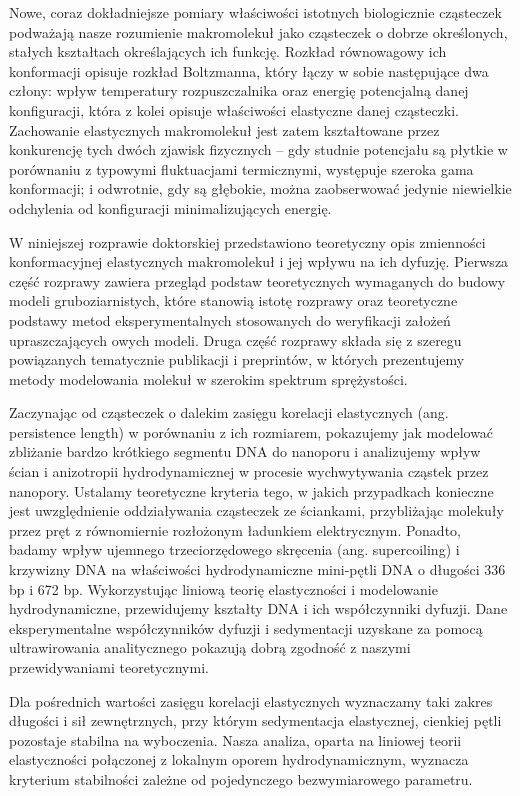 Nowe, coraz dokładniejsze pomiary właściwości istotnych biologicznie cząsteczek podważają nasze rozumienie makromolekuł jako cząsteczek o dobrze określonych, stałych kształtach określających ich funkcję.
Rozkład równowagowy ich konformacji opisuje rozkład Boltzmanna, który łączy w sobie następujące dwa człony: wpływ temperatury rozpuszczalnika oraz energię potencjalną danej konfiguracji, która z kolei opisuje właściwości elastyczne danej cząsteczki.
Zachowanie elastycznych makromolekuł jest zatem kształtowane przez konkurencję tych dwóch zjawisk fizycznych -- gdy studnie potencjału są płytkie w porównaniu z typowymi fluktuacjami termicznymi, występuje szeroka gama konformacji; i odwrotnie, gdy są głębokie, można zaobserwować jedynie niewielkie odchylenia od konfiguracji minimalizujących energię.

W niniejszej rozprawie doktorskiej przedstawiono teoretyczny opis zmienności konformacyjnej elastycznych makromolekuł i jej wpływu na ich dyfuzję.
Pierwsza część rozprawy zawiera przegląd podstaw teoretycznych wymaganych do budowy modeli gruboziarnistych, które stanowią istotę rozprawy oraz teoretyczne podstawy metod eksperymentalnych stosowanych do weryfikacji założeń upraszczających owych modeli.
Druga część rozprawy składa się z szeregu powiązanych tematycznie publikacji i preprintów, w których prezentujemy metody modelowania molekuł w szerokim spektrum sprężystości.

Zaczynając od cząsteczek o dalekim zasięgu korelacji elastycznych (ang. persistence length) w porównaniu z ich rozmiarem, pokazujemy jak modelować zbliżanie bardzo krótkiego segmentu DNA do nanoporu i analizujemy wpływ ścian i anizotropii hydrodynamicznej w procesie wychwytywania cząstek przez nanopory.
Ustalamy teoretyczne kryteria tego, w jakich przypadkach konieczne jest uwzględnienie oddziaływania cząsteczek ze ściankami, przybliżając molekuły przez pręt z równomiernie rozłożonym ładunkiem elektrycznym.
Ponadto, badamy wpływ ujemnego trzeciorzędowego skręcenia (ang. supercoiling) i krzywizny DNA na właściwości hydrodynamiczne mini-pętli DNA o długości 336 bp i 672 bp.
Wykorzystując liniową teorię elastyczności i modelowanie hydrodynamiczne, przewidujemy kształty DNA i ich współczynniki dyfuzji.
Dane eksperymentalne współczynników dyfuzji i sedymentacji uzyskane za pomocą ultrawirowania analitycznego pokazują dobrą zgodność z naszymi przewidywaniami teoretycznymi.

Dla pośrednich wartości zasięgu korelacji elastycznych wyznaczamy taki zakres długości i sił zewnętrznych, przy którym sedymentacja elastycznej, cienkiej pętli pozostaje stabilna na wyboczenia.
Nasza analiza, oparta na liniowej teorii elastyczności połączonej z lokalnym oporem hydrodynamicznym, wyznacza kryterium stabilności zależne od pojedynczego bezwymiarowego parametru.

